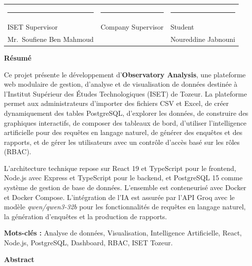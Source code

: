 \documentclass[12pt,a4paper]{report}
\begin{document}
\begin{center}
\begin{tabular}{p{5cm}p{5cm}p{5cm}}
\rule{5cm}{0.4pt} & \rule{5cm}{0.4pt} & \rule{5cm}{0.4pt} \\
ISET Supervisor & Company Supervisor & Student \\
Mr.~Soufiene Ben Mahmoud & \hspace{3cm} & Noureddine Jabnouni \\
\end{tabular}
\end{center}

\newpage
\thispagestyle{empty}
\begin{center}
{\Large\bfseries Résumé}
\end{center}
\vspace{0.5cm}

Ce projet présente le développement d'\textbf{Observatory Analysis}, une plateforme web modulaire de gestion, d'analyse et de visualisation de données destinée à l'Institut Supérieur des Études Technologiques (ISET) de Tozeur. La plateforme permet aux administrateurs d'importer des fichiers CSV et Excel, de créer dynamiquement des tables PostgreSQL, d'explorer les données, de construire des graphiques interactifs, de composer des tableaux de bord, d'utiliser l'intelligence artificielle pour des requêtes en langage naturel, de générer des enquêtes et des rapports, et de gérer les utilisateurs avec un contrôle d'accès basé sur les rôles (RBAC).

L'architecture technique repose sur React 19 et TypeScript pour le frontend, Node.js avec Express et TypeScript pour le backend, et PostgreSQL 15 comme système de gestion de base de données. L'ensemble est conteneurisé avec Docker et Docker Compose. L'intégration de l'IA est assurée par l'API Groq avec le modèle \textit{qwen/qwen3-32b} pour les fonctionnalités de requêtes en langage naturel, la génération d'enquêtes et la production de rapports.

\vspace{0.3cm}
\textbf{Mots-clés :} Analyse de données, Visualisation, Intelligence Artificielle, React, Node.js, PostgreSQL, Dashboard, RBAC, ISET Tozeur.

\vspace{1cm}
\begin{center}
{\Large\bfseries Abstract}
\end{center}
\vspace{0.5cm}
\end{document}
